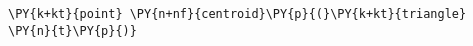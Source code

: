 \begin{Verbatim}[commandchars=\\\{\}]
    \PY{k+kt}{point} \PY{n+nf}{centroid}\PY{p}{(}\PY{k+kt}{triangle} \PY{n}{t}\PY{p}{)}
\end{Verbatim}
